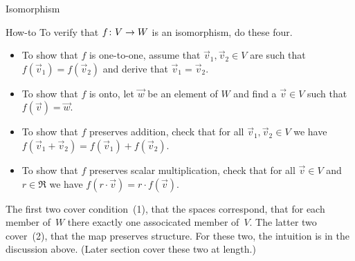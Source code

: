 \documentclass[9pt,t]{beamer}
\begin{document}
\begin{frame}{Isomorphism}
\end{frame}


\begin{frame}{How-to}
To verify that $\mbox{$f\colon V\to W$}$ is an isomorphism,
do these four.
\begin{itemize}
  \item To show that $f$ is one-to-one, 
    assume that $\vec{v}_1,\vec{v}_2\in V$ are such that
    $f(\vec{v}_1)=f(\vec{v}_2)$
    and derive that $\vec{v}_1=\vec{v}_2$.
  \item To show that $f$ is onto,
    let $\vec{w}$ be an element of $ W$ and find a $\vec{v}\in V$
    such that $f(\vec{v})=\vec{w}$.
  \item To show that $f$ preserves addition, check that for all 
    $\vec{v}_1,\vec{v}_2\in V$
    we have $f(\vec{v}_1+\vec{v}_2)=f(\vec{v}_1)+f(\vec{v}_2)$.
  \item To show that $f$ preserves scalar multiplication, check that for all 
    $\vec{v}\in V$ and $r\in\Re$
    we have $f(r\cdot\vec{v})=r\cdot f(\vec{v})$.
\end{itemize}
The first two cover condition~(1), that the spaces correspond, that 
for each member of~$W$ there exactly one associcated member of~$V$.
The latter two cover~(2), that the map preserves structure.
For these two, the intuition is in the discussion above.
(Later section cover these two at length.)
\end{frame}
\end{document}
